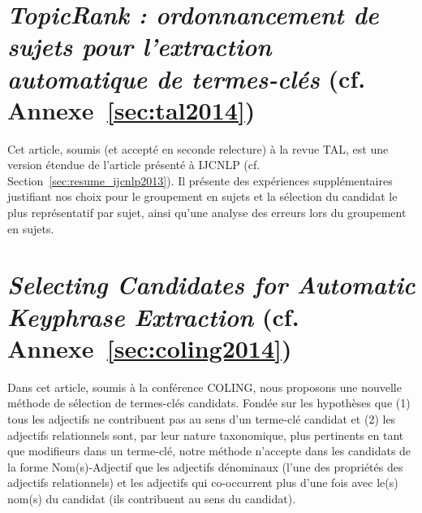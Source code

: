   \section{\textit{TopicRank : ordonnancement de sujets pour l'extraction
           automatique de termes-clés} (cf. Annexe~\ref{sec:tal2014})}
    Cet article, soumis (et accepté en seconde relecture) à la revue TAL, est
    une version étendue de l'article présenté à IJCNLP (cf.
    Section~\ref{sec:resume_ijcnlp2013}). Il présente des expériences
    supplémentaires justifiant nos choix pour le groupement en sujets et la
    sélection du candidat le plus représentatif par sujet, ainsi qu'une analyse
    des erreurs lors du groupement en sujets.

  \section{\textit{Selecting Candidates for Automatic Keyphrase Extraction} (cf.
           Annexe~\ref{sec:coling2014})}
    Dans cet article, soumis à la conférence COLING, nous proposons une nouvelle
    méthode de sélection de termes-clés candidats. Fondée sur les hypothèses que
    (1) tous les adjectifs ne contribuent pas au sens d'un terme-clé candidat
    et (2) les adjectifs relationnels sont, par leur nature taxonomique, plus
    pertinents en tant que modifieurs dans un terme-clé, notre méthode n'accepte
    dans les candidats de la forme Nom(s)-Adjectif que les adjectifs dénominaux
    (l'une des propriétés des adjectifs relationnels) et les adjectifs qui
    co-occurrent plus d'une fois avec le(s) nom(s) du candidat (ils contribuent
    au sens du candidat).


